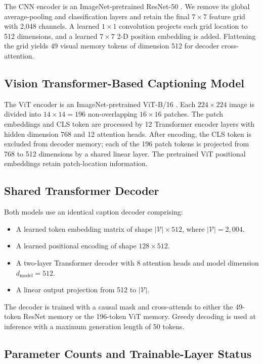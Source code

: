 \documentclass[conference]{IEEEtran}
\begin{document}
The CNN encoder is an ImageNet-pretrained ResNet-50 \cite{he2016}. We remove its global average-pooling and classification layers and retain the final $7\times7$ feature grid with 2{,}048 channels. A learned $1\times1$ convolution projects each grid location to 512 dimensions, and a learned $7\times7$ 2-D position embedding is added. Flattening the grid yields 49 visual memory tokens of dimension 512 for decoder cross-attention.

\subsection{Vision Transformer-Based Captioning Model}

The ViT encoder is an ImageNet-pretrained ViT-B/16 \cite{dosovitskiy2021}. Each $224\times224$ image is divided into $14\times14=196$ non-overlapping $16\times16$ patches. The patch embeddings and CLS token are processed by 12 Transformer encoder layers with hidden dimension 768 and 12 attention heads. After encoding, the CLS token is excluded from decoder memory; each of the 196 patch tokens is projected from 768 to 512 dimensions by a shared linear layer. The pretrained ViT positional embeddings retain patch-location information.

\subsection{Shared Transformer Decoder}

Both models use an identical caption decoder comprising:
\begin{itemize}
    \item A learned token embedding matrix of shape $|\mathcal{V}| \times 512$, where $|\mathcal{V}|=2{,}004$.
    \item A learned positional encoding of shape $128 \times 512$.
    \item A two-layer Transformer decoder with 8 attention heads and model dimension $d_{\text{model}}=512$.
    \item A linear output projection from 512 to $|\mathcal{V}|$.
\end{itemize}
The decoder is trained with a causal mask and cross-attends to either the 49-token ResNet memory or the 196-token ViT memory. Greedy decoding is used at inference with a maximum generation length of 50 tokens.

\subsection{Parameter Counts and Trainable-Layer Status}
\end{document}
